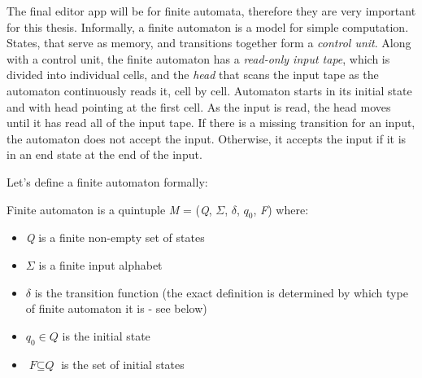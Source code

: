 The final editor app will be for finite automata, therefore they are very important for this thesis. Informally, a finite automaton is a model for simple computation. States, that serve as memory, and transitions together form a \textit{control unit}. Along with a control unit, the finite automaton has a \textit{read-only input tape}, which is divided into individual cells, and the \textit{head} that scans the input tape as the automaton continuously reads it, cell by cell. Automaton starts in its initial state and with head pointing at the first cell. As the input is read, the head moves until it has read all of the input tape. If there is a missing transition for an input, the automaton does not accept the input. Otherwise, it accepts the input if it is in an end state at the end of the input.

Let's define a finite automaton formally:
\begin{definition}
    Finite automaton is a quintuple \textit{M} = (\textit{Q}, $\Sigma$, $\delta$, $\textit{q}_0$, \textit{F}) where:
    \begin{itemize}
        \item \textit{Q} is a finite non-empty set of states
        \item $\Sigma$ is a finite input alphabet
        \item $\delta$ is the transition function (the exact definition is determined by which type of finite automaton it is - see below)
        \item $\textit{q}_0 \in \textit{Q}$ is the initial state
        \item $\textit{F} \subseteq \textit{Q}$ is the set of initial states
    \end{itemize}
\end{definition}

